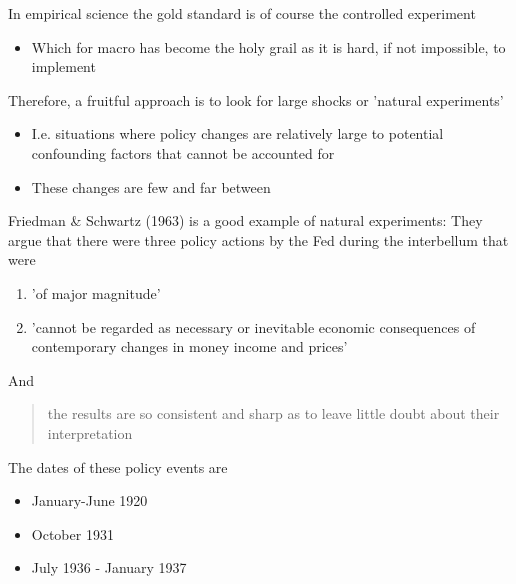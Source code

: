 \documentclass{beamer}
\begin{document}
\begin{frame}
 In empirical science the gold standard is of course the controlled experiment
 \medskip  
  \begin{itemize}
    \item Which for macro has become the holy grail as it is hard, if not impossible, to implement
  \end{itemize}
  \medskip
  Therefore, a fruitful approach is to look for large shocks or 'natural experiments'
  \begin{itemize}
    \item I.e. situations where policy changes are relatively large to potential confounding factors that cannot be accounted for
    \item These changes are few and far between 
  \end{itemize}
\end{frame}

\begin{frame}
  Friedman \& Schwartz (1963) is a good example of natural experiments: They argue that there were three policy actions by the Fed during the interbellum that were  
  \begin{enumerate}
    \item 'of major magnitude'
    \item 'cannot be regarded as necessary or inevitable economic consequences of contemporary changes in money income and prices'
  \end{enumerate}
  \medskip
  And
  \begin{quote}
    the results are so consistent and sharp as to leave little doubt about their interpretation
  \end{quote}
  \medskip
  The dates of these policy events are   
  \begin{itemize}
    \item January-June 1920
    \item October 1931
    \item July 1936 - January 1937
  \end{itemize}
\end{frame}
\end{document}

